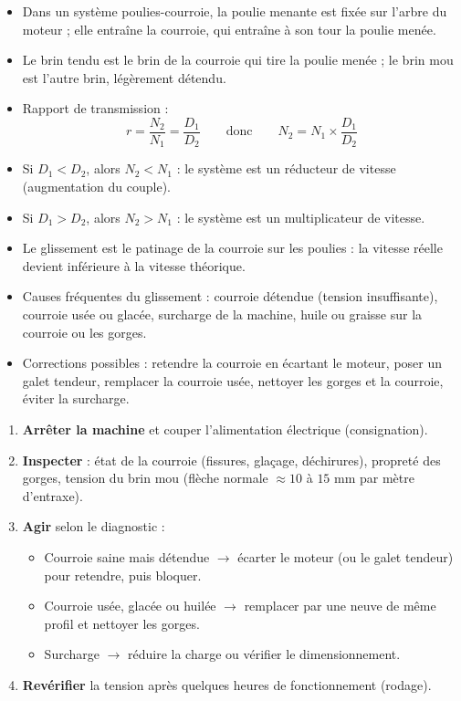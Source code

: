\documentclass[11pt]{article}
\newcommand{\cle}[1]{{\popxbold\color{popdark}#1}}
\begin{document}
\begin{aretenir}
\begin{itemize}
\item Dans un système poulies-courroie, la \cle{poulie menante} est fixée sur l'arbre du moteur ; elle entraîne la \cle{courroie}, qui entraîne à son tour la \cle{poulie menée}.
\item Le \cle{brin tendu} est le brin de la courroie qui tire la poulie menée ; le \cle{brin mou} est l'autre brin, légèrement détendu.
\item Rapport de transmission : \[ r = \frac{N_2}{N_1} = \frac{D_1}{D_2} \qquad \text{donc} \qquad N_2 = N_1 \times \frac{D_1}{D_2} \]
\item Si $D_1 < D_2$, alors $N_2 < N_1$ : le système est un \cle{réducteur} de vitesse (augmentation du couple).
\item Si $D_1 > D_2$, alors $N_2 > N_1$ : le système est un \cle{multiplicateur} de vitesse.
\item Le \cle{glissement} est le patinage de la courroie sur les poulies : la vitesse réelle devient inférieure à la vitesse théorique.
\item Causes fréquentes du glissement : courroie détendue (tension insuffisante), courroie usée ou glacée, surcharge de la machine, huile ou graisse sur la courroie ou les gorges.
\item Corrections possibles : retendre la courroie en écartant le moteur, poser un \cle{galet tendeur}, remplacer la courroie usée, nettoyer les gorges et la courroie, éviter la surcharge.
\end{itemize}
\end{aretenir}

\begin{methode}
\begin{enumerate}
\item \textbf{Arrêter la machine} et couper l'alimentation électrique (consignation).
\item \textbf{Inspecter} : état de la courroie (fissures, glaçage, déchirures), propreté des gorges, tension du brin mou (flèche normale $\approx 10$ à $15$ mm par mètre d'entraxe).
\item \textbf{Agir} selon le diagnostic :
      \begin{itemize}
      \item Courroie saine mais détendue $\rightarrow$ écarter le moteur (ou le galet tendeur) pour retendre, puis bloquer.
      \item Courroie usée, glacée ou huilée $\rightarrow$ remplacer par une neuve de même profil et nettoyer les gorges.
      \item Surcharge $\rightarrow$ réduire la charge ou vérifier le dimensionnement.
      \end{itemize}
\item \textbf{Revérifier} la tension après quelques heures de fonctionnement (rodage).
\end{enumerate}
\end{methode}
\end{document}
